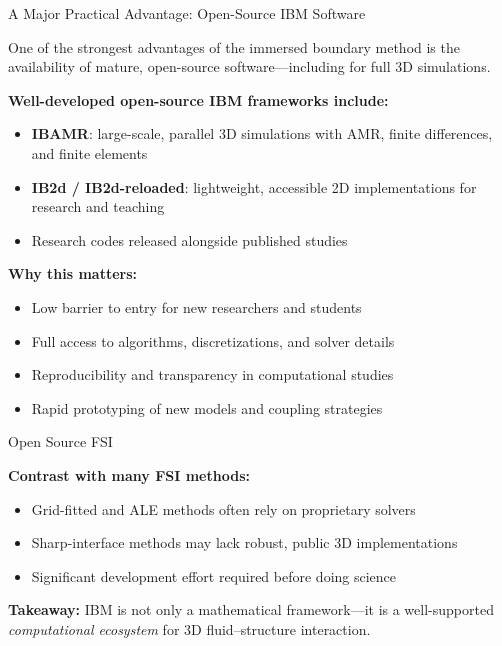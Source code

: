 \documentclass{beamer}
\begin{document}
\begin{frame}{A Major Practical Advantage: Open-Source IBM Software}
\small

One of the strongest advantages of the immersed boundary method is the
availability of mature, open-source software—including for full 3D simulations.

\medskip

\textbf{Well-developed open-source IBM frameworks include:}
\begin{itemize}
    \item \textbf{IBAMR}: large-scale, parallel 3D simulations with AMR,
          finite differences, and finite elements
    \item \textbf{IB2d / IB2d-reloaded}: lightweight, accessible 2D implementations
          for research and teaching
    \item Research codes released alongside published studies
\end{itemize}

\medskip

\textbf{Why this matters:}
\begin{itemize}
    \item Low barrier to entry for new researchers and students
    \item Full access to algorithms, discretizations, and solver details
    \item Reproducibility and transparency in computational studies
    \item Rapid prototyping of new models and coupling strategies
\end{itemize}

\end{frame}

\begin{frame}{Open Source FSI}

\textbf{Contrast with many FSI methods:}
\begin{itemize}
    \item Grid-fitted and ALE methods often rely on proprietary solvers
    \item Sharp-interface methods may lack robust, public 3D implementations
    \item Significant development effort required before doing science
\end{itemize}

\medskip

\textbf{Takeaway:}  
IBM is not only a mathematical framework—it is a well-supported
\emph{computational ecosystem} for 3D fluid--structure interaction.

\end{frame}
\end{document}
